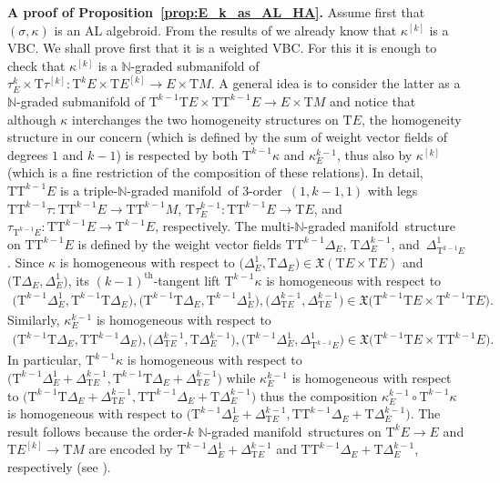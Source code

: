 \documentclass[pdftex]{sigma}
\newcommand{\grB}{{$\N$-graded manifold}}
\newcommand{\ZM}{{VBC}} %
\newcommand{\degree}{{order}}
\newcommand{\thh}[1]{#1^{\mathrm{th}}} %
\newcommand{\N}{\mathbb{N}}
\newcommand{\ra}{\rightarrow}
\newcommand{\E}[1]{E^{[#1]}} %
\newcommand{\T}{\mathrm{T}} %
\newcommand{\TT}[1]{\mathrm{T}^{#1}} %
\newcommand{\VF}{\mathfrak{X}}
\numberwithin{equation}{section}
\theoremstyle{definition}
\begin{document}
{\bf A proof of Proposition~\ref{prop:E_k_as_AL_HA}.} %
 Assume first that $(\sigma,\kappa)$ is an AL algebroid. From the results of \cite[Theorem~4.5(ix)]{MJ_MR_models_high_alg_2015} we already know that $\kappa^{[k]}$ is a \ZM . We shall prove first that it is a weighted \ZM . For this it is enough to check that $\kappa^{[k]}$ is a $\N$-graded submani\-fold of $\tau^k_E\times \T\tau^{[k]}\colon \TT{k} E\times \T\E{k} \ra E\times \T M$. A general idea is to consider the latter as a $\N$-graded submanifold of $\TT{k-1}\T E\times \T\TT{k-1} E\ra E\times \T M$ and notice that although $\kappa$ interchanges the two homogeneity structures on $\T E$, the homogeneity structure in our concern (which is defined by the sum of weight vector fields of degrees $1$ and $k-1$) is respected by both $\TT{k-1}\kappa$ and $\kappa^{k-1}_E$, thus also by $\kappa^{[k]}$ (which is a fine restriction of the composition of these relations). In detail,
$\T\TT{k-1} E$ is a triple-\grB\ of $3$-\degree\ $(1, k-1, 1)$ with legs $\T\TT{k-1} \tau\colon \T\TT{k-1} E\ra \T\TT{k-1} M$, $\T\tau^{k-1}_E\colon \T\TT{k-1} E \ra \T E$, and $\tau_{\TT{k-1} E}\colon \T\TT{k-1} E\ra \TT{k-1} E$, respectively. The multi-\grB\ structure on $\T\TT{k-1} E$ is defined by the weight vector fields $\T\TT{k-1}\Delta_E$, $\T\Delta^{k-1}_E$, and~$\Delta^1_{\TT{k-1} E}$. Since $\kappa$ is homogeneous with respect to $\big(\Delta^1_E, \T\Delta_E\big)\in\VF(\T E \times \T E)$ and $\big(\T\Delta_E, \Delta^1_E\big)$, its $\thh{(k-1)}$-tangent lift $\TT{k-1}\kappa$ is homogeneous with respect to
\begin{gather*}\big(\TT{k-1}\Delta^1_E, \TT{k-1}\T\Delta_E\big), \big(\TT{k-1}\T\Delta_E, \TT{k-1}\Delta^1_E\big), \big(\Delta^{k-1}_{\T E}, \Delta^{k-1}_{\T E}\big) \in \VF\big(\TT{k-1} \T E \times \TT{k-1} \T E\big).\end{gather*}
Similarly, $\kappa^{k-1}_E$ is homogeneous with respect to
\begin{gather*}
\big(\TT{k-1}\T\Delta_E, \T\TT{k-1} \Delta_E\big), \big(\Delta^{k-1}_{\T E}, \T\Delta^{k-1}_E\big), \big(\TT{k-1} \Delta^1_E, \Delta^1_{\TT{k-1} E}\big) \in \VF\big(\TT{k-1}\T E\times \T \TT{k-1} E\big).
\end{gather*}
In particular, $\TT{k-1}\kappa$ is homogeneous with respect to $\big(\TT{k-1}\Delta^1_E+\Delta^{k-1}_{\T E}, \TT{k-1}\T\Delta_E + \Delta^{k-1}_{\T E}\big)$ while $\kappa^{k-1}_E$ is homogeneous with respect to $\big(\TT{k-1}\T\Delta_E + \Delta^{k-1}_{\T E}, \T\TT{k-1} \Delta_E+\T \Delta^{k-1}_E\big)$ thus the composition $\kappa^{k-1}_E\circ \TT{k-1}\kappa$ is homogeneous with respect to $\big(\TT{k-1}\Delta^1_E+\Delta^{k-1}_{\T E}, \T\TT{k-1} \Delta_E+\T \Delta^{k-1}_E\big)$. The result follows because the \degree-$k$ \grB\ structures on $\TT{k} E \ra E$ and $\T\E{k}\ra \T M$ are encoded by $\TT{k-1}\Delta^1_E+\Delta^{k-1}_{\T E}$ and $\T\TT{k-1} \Delta_E+\T \Delta^{k-1}_E$, respectively (see \cite[Theorem~4.5(i)]{MJ_MR_models_high_alg_2015}).
\end{document}
